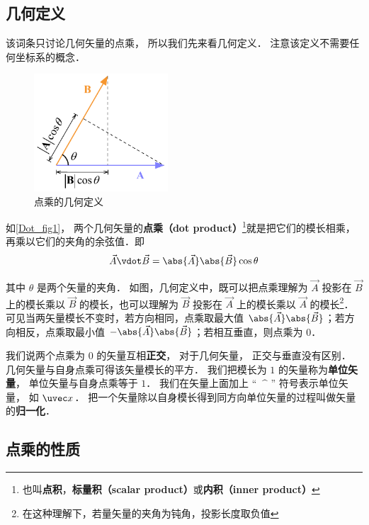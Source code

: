

\subsection{几何定义}
该词条只讨论几何矢量的点乘， 所以我们先来看几何定义． 注意该定义不需要任何坐标系的概念．
\begin{figure}[th]
\centering
\includegraphics[width=5cm]{./figures/Dot1.pdf}
\caption{点乘的几何定义}\label{Dot_fig1}
\end{figure}

如\autoref{Dot_fig1}， 两个几何矢量的\textbf{点乘（dot product）}\footnote{也叫\textbf{点积}，\textbf{标量积（scalar product）}或\textbf{内积（inner product）}}就是把它们的模长相乘，再乘以它们的夹角的余弦值．即
\begin{equation}\label{Dot_eq1}
\vec A \vdot \vec B = \abs{\vec A} \abs{\vec B} \cos\theta 
\end{equation}

其中 $\theta$ 是两个矢量的夹角． 如图，几何定义中，既可以把点乘理解为 $\vec A$ 投影在 $\vec B$ 上的模长乘以 $\vec B$ 的模长，也可以理解为 $\vec B$ 投影在 $\vec A$ 上的模长乘以 $\vec A$ 的模长\footnote{在这种理解下，若量矢量的夹角为钝角，投影长度取负值}．可见当两矢量模长不变时，若方向相同，点乘取最大值 $\abs{\vec A}\abs{\vec B}$；若方向相反，点乘取最小值 $-\abs{\vec A}\abs{\vec B}$；若相互垂直，则点乘为 0．

我们说两个点乘为 0 的矢量互相\textbf{正交}， 对于几何矢量， 正交与垂直没有区别． 几何矢量与自身点乘可得该矢量模长的平方． 我们把模长为 $1$ 的矢量称为\textbf{单位矢量}， 单位矢量与自身点乘等于 $1$． 我们在矢量上面加上 “ $\ \^$ ” 符号表示单位矢量， 如 $\uvec x$． 把一个矢量除以自身模长得到同方向单位矢量的过程叫做矢量的\textbf{归一化}．

\subsection{点乘的性质}

